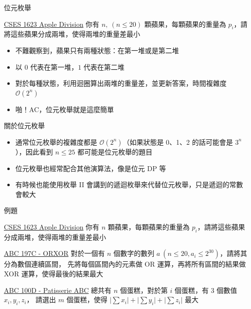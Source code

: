 \documentclass[aspectratio=169]{beamer}
\begin{document}
    \begin{frame}{位元枚舉}
        \begin{block}{\href{https://cses.fi/problemset/task/1623}{CSES 1623 Apple Division}}
            你有 $n,\ (n \le 20)$ 顆蘋果，每顆蘋果的重量為 $p_i$，請將這些蘋果分成兩堆，使得兩堆的重量差最小
        \end{block}

        \begin{itemize}
            \item<1-> 不難觀察到，蘋果只有兩種狀態：在第一堆或是第二堆
            \item<2-> 以 $0$ 代表在第一堆，$1$ 代表在第二堆
            \item<3-> 對於每種狀態，利用迴圈算出兩堆的重量差，並更新答案，時間複雜度 $\mathcal{O}(2^n)$
            \item<4-> 啪！AC，位元枚舉就是這麼簡單
        \end{itemize}
    \end{frame}

    \begin{frame}{關於位元枚舉}
        \begin{itemize}
            \item 通常位元枚舉的複雜度都是 $\mathcal{O}(2^n)$（如果狀態是 0、1、2 的話可能會是 $3^n$），因此看到 $n \le 25$ 都可能是位元枚舉的題目
            \item 位元枚舉也經常配合其他演算法，像是位元 DP 等
            \item 有時候也能使用枚舉 II 會講到的遞迴枚舉來代替位元枚舉，只是遞迴的常數會較大
        \end{itemize}
    \end{frame}

    \begin{frame}{例題}
        \begin{block}{\href{https://cses.fi/problemset/task/1623}{CSES 1623 Apple Division}}
            你有 $n$ 顆蘋果，每顆蘋果的重量為 $p_i$，請將這些蘋果分成兩堆，使得兩堆的重量差最小
        \end{block}

        \begin{block}{\href{https://atcoder.jp/contests/abc197/tasks/abc197_c}{ABC 197C - ORXOR}}
            對於一個有 $n$ 個數字的數列 $a\ (n \le 20, a_i \le 2^30)$，請將其分為數個連續區間，
            先將每個區間內的元素做 OR 運算，再將所有區間的結果做 XOR 運算，使得最後的結果最大
        \end{block}

        \begin{block}{\href{https://atcoder.jp/contests/abc100/tasks/abc100_d}{ABC 100D - Patisserie ABC}}
            總共有 $n$ 個蛋糕，對於第 $i$ 個蛋糕，有 $3$ 個數值 $x_i, y_i, z_i$，
            請選出 $m$ 個蛋糕，使得 $\lvert \sum{x_i} \rvert + \lvert \sum{y_i} \rvert + \lvert \sum{z_i} \rvert$ 最大
        \end{block}

    \end{frame}
    
\end{document}
